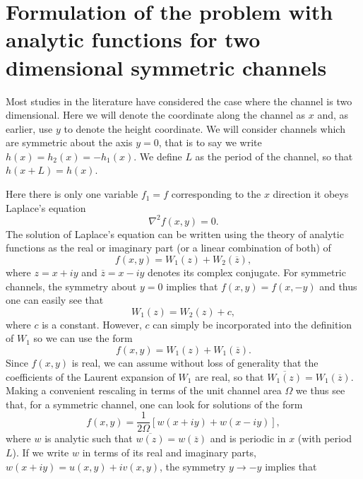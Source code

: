 \documentclass[pre,showpacs,preprintnumbers,amsmath,amssymb,superscriptaddress]{revtex4-1}
\begin{document}
{\section{Formulation of the problem with analytic functions for two dimensional symmetric channels}
\label{Sec2}

 Most studies in the literature have considered the case where the channel is two dimensional.
 Here we will denote the 
coordinate along the channel as $x$ and, as earlier, use  $y$ to denote the height coordinate. We will consider channels which are symmetric about the axis
$y=0$, that is to say we write $h(x)=h_2(x)=-h_1(x)$. We define $L$ as the period of the channel, so that $h(x+L)=h(x)$. 

Here there is only one variable $f_1=f$ corresponding to the $x$ direction it obeys
Laplace's equation 
\begin{equation}
\nabla^2 f(x,y)=0.
\end{equation}
The solution of Laplace's equation can be written using the theory of analytic functions as the real  or  imaginary part (or a linear combination of both) of
\begin{equation}
f(x,y) = W_1(z) + W_2(\overline z),
\end{equation}
where $z= x+iy$ and $\overline z= x-iy$ denotes its complex conjugate. For symmetric channels, the  symmetry about $y=0$ implies that $f(x,y)=f(x,-y)$ and thus one can easily see that
\begin{equation}
W_1(z) = W_2(z) + c,
\end{equation}
where $c$ is a constant. However, $c$ can simply be incorporated into the definition of $W_1$ so we can use the form
\begin{equation}
f(x,y) = W_1(z) + W_1(\overline z).
\end{equation}
Since $f(x,y)$ is real, we can assume without loss of generality that the coefficients of the Laurent expansion of $W_1$ are real, so that $\overline{ W_{1}(z)}= W_{1}(\overline z)$. Making a convenient rescaling in terms of the unit channel area $\Omega$ we thus see that, for a symmetric channel, one can look for solutions of the form 
\begin{equation}
f(x,y) = \frac{1}{2\Omega}[w(x+iy) + w(x-iy)],\label{gen}
\end{equation}
where $w$ is analytic such that $\overline{ w(z)}= w(\overline z)$ and is periodic in $x$ (with period $L$). If we write $w$ in terms of its real and imaginary parts, $w(x+iy) = u(x,y) +iv(x,y)$, the symmetry $y\to-y$ implies that
}
\end{document}
